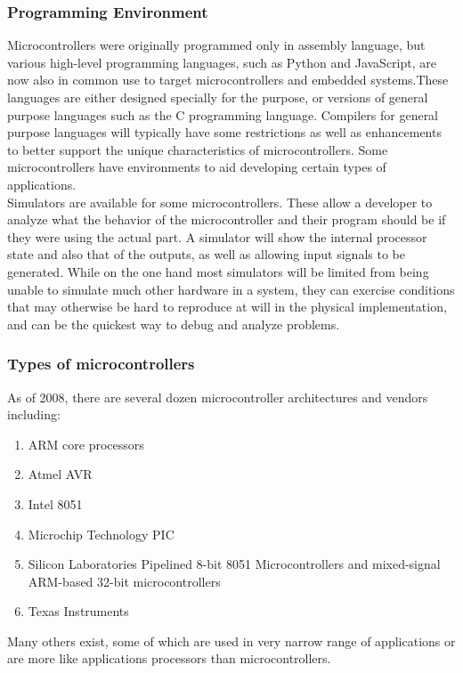 \subsubsection{Programming Environment}
Microcontrollers were originally programmed only in assembly language, but various high-level programming languages, such as Python and JavaScript, are now also in common use to target microcontrollers and embedded systems.These languages are either designed specially for the purpose, or versions of general purpose languages such as the C programming language. Compilers for general purpose languages will typically have some restrictions as well as enhancements to better support the unique characteristics of microcontrollers. Some microcontrollers have environments to aid developing certain types of applications.\\
Simulators are available for some microcontrollers. These allow a developer to analyze what the behavior of the microcontroller and their program should be if they were using the actual part. A simulator will show the internal processor state and also that of the outputs, as well as allowing input signals to be generated. While on the one hand most simulators will be limited from being unable to simulate much other hardware in a system, they can exercise conditions that may otherwise be hard to reproduce at will in the physical implementation, and can be the quickest way to debug and analyze problems.
\subsubsection{Types of microcontrollers}
As of 2008, there are several dozen microcontroller architectures and vendors including:
\begin{enumerate}
\item ARM core processors
\item Atmel AVR
\item Intel 8051
\item Microchip Technology PIC
\item Silicon Laboratories Pipelined 8-bit 8051 Microcontrollers and mixed-signal ARM-based 32-bit microcontrollers
\item Texas Instruments  
\end{enumerate}
\justify Many others exist, some of which are used in very narrow range of applications or are more like applications processors than microcontrollers.
